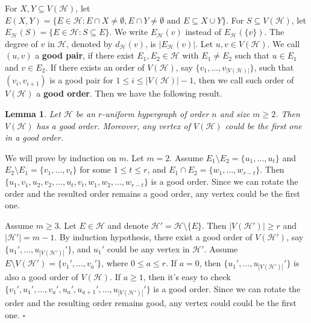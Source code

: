 \documentclass[12pt]{article}%
\newtheorem{lemma}[theorem]{Lemma}
\newenvironment{proof}{{\noindent\it Proof.}}{\hfill $\square$\par}
\newcommand{\mh}{\mathcal{H}}
\begin{document}
 For  $X,Y\subseteq V(\mh)$, let $E(X,Y)=\{ E\in \mh: E\cap X \neq \emptyset, E\cap Y\neq \emptyset \text{~and~} E\subseteq X\cup Y \}.$
 For  $S\subseteq V(\mh)$, let $E_\mh(S)=\{E\in \mh: S\subseteq E\}$. We write $E_\mh(v)$ instead of $E_\mh(\{v\})$. The degree of $v$ in $\mh$, denoted by $d_{\mh}(v)$, is $|E_\mh(v)|$.
Let $u,v\in V(\mh)$. We call  $(u,v)$ a \textbf{good pair}, if there exist  $E_1,E_2\in \mh$ with $E_1\not=E_2$ such that $u\in E_1$ and $v\in E_2$. If  there exists an order of $V(\mh)$, say $\{v_1,\dots,v_{|V(\mh)|}\}$, such that $(v_i,v_{i+1})$ is a good pair for $1\le i\le |V(\mh)|-1$, then we call such order of $V(\mh)$  a \textbf{good order}.
Then we have the following result.
\begin{lemma}\label{lem: good order} Let $\mh$
    be an $r$-uniform hypergraph of order $n$  and size $m\geq 2$. Then  $V(\mh)$ has a good order. Moreover, any vertex of $V(\mh)$ could be the first one in a good order.
\end{lemma}
 \begin{proof}
     We will prove by induction on  $m$. Let $m=2$. Assume  $E_1\setminus E_2=\{u_1,\dots,u_t\}$ and  $E_2\setminus E_1=\{v_1,\dots,v_t\}$ for some $1\leq t\leq r$, and  $E_1\cap E_2=\{w_1,\dots,w_{r-t}\}$. Then $\{u_1,v_1,u_2,v_2,\dots,u_t,v_t,w_1,w_2,\dots,w_{r-t}\}$ is a good order. Since we can rotate the order and the resulted order remains a good order, any vertex could be the  first one.

    Assume $m\geq 3$. Let $E\in \mh$ and denote $\mh'=\mh\setminus\{E\}$. Then $|V(\mh')|\geq r$ and $|\mh'|=m-1$. By induction hypothesis, there exist a good order of $V(\mh')$, say $\{u_1',\dots,u_{|V(\mh')|}'\}$, and $u_1'$ could be any vertex in $\mh'$. Assume $E\setminus V(\mh')=\{v_1',\dots,v_a'\}$, where $0\leq a\leq r$. If $a=0$, then $\{u_1',\dots,u_{|V(\mh')|}'\}$ is also a good order of $V(\mh)$. If $a\geq 1$, then it's easy to check $\{v_1',u_1',\dots,v_a',u_a',u_{a+1}',\dots,u_{|V(\mh')|}'\}$ is a good order. Since we can rotate the order and the resulting order remains good, any vertex could could be the  first one.
 \end{proof}
\end{document}
